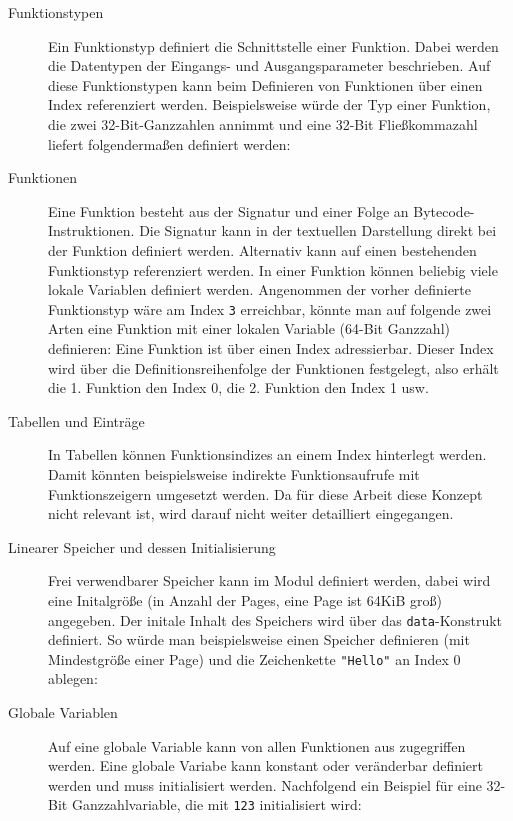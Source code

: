 \begin{description}
    \item[Funktionstypen] Ein Funktionstyp definiert die Schnittstelle einer Funktion. Dabei werden die Datentypen der Eingangs- und Ausgangsparameter beschrieben. Auf diese Funktionstypen kann beim Definieren von Funktionen über einen Index referenziert werden. Beispielsweise würde der Typ einer Funktion, die zwei 32-Bit-Ganzzahlen annimmt und eine 32-Bit Fließkommazahl liefert folgendermaßen definiert werden: 
    \item[Funktionen] Eine Funktion besteht aus der Signatur und einer Folge an Bytecode-Instruktionen. Die Signatur kann in der textuellen Darstellung direkt bei der Funktion definiert werden. Alternativ kann auf einen bestehenden Funktionstyp referenziert werden. In einer Funktion können beliebig viele lokale Variablen definiert werden. Angenommen der vorher definierte Funktionstyp wäre am Index \lstinline{3} erreichbar, könnte man auf folgende zwei Arten eine Funktion mit einer lokalen Variable (64-Bit Ganzzahl) definieren: 
    Eine Funktion ist über einen Index adressierbar. Dieser Index wird über die Definitionsreihenfolge der Funktionen festgelegt, also erhält die 1. Funktion den Index 0, die 2. Funktion den Index 1 usw.
    \item[Tabellen und Einträge] In Tabellen können Funktionsindizes an einem Index hinterlegt werden. Damit könnten beispielsweise indirekte Funktionsaufrufe mit Funktionszeigern umgesetzt werden. Da für diese Arbeit diese Konzept nicht relevant ist, wird darauf nicht weiter detailliert eingegangen.
    \item[Linearer Speicher und dessen Initialisierung] Frei verwendbarer Speicher kann im Modul definiert werden, dabei wird eine Initalgröße (in Anzahl der Pages, eine Page ist 64KiB groß) angegeben. Der initale Inhalt des Speichers wird über das \lstinline{data}-Konstrukt definiert. So würde man beispielsweise einen Speicher definieren (mit Mindestgröße einer Page) und die Zeichenkette \lstinline{"Hello"} an Index 0 ablegen: 
    \item[Globale Variablen] Auf eine globale Variable kann von allen Funktionen aus zugegriffen werden. Eine globale Variabe kann konstant oder veränderbar definiert werden und muss initialisiert werden. Nachfolgend ein Beispiel für eine 32-Bit Ganzzahlvariable, die mit \lstinline{123} initialisiert wird: 

\end{description}
